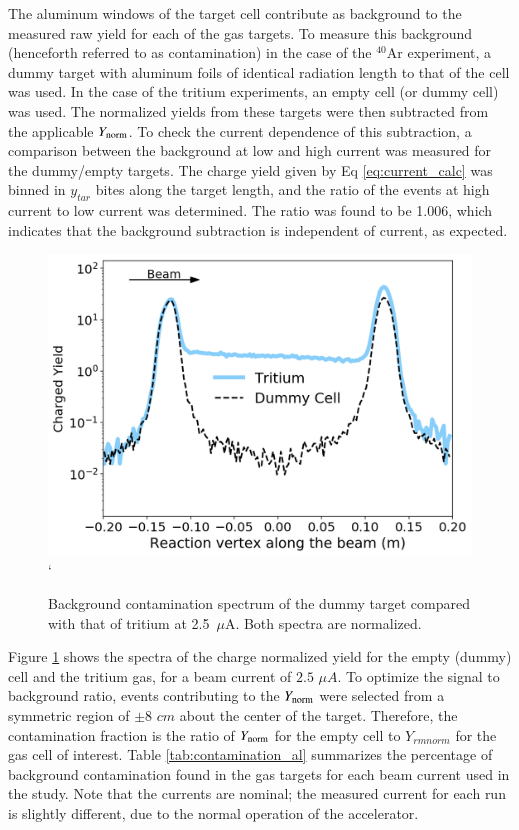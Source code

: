 \documentclass[final,5p,times,twocolumn]{elsarticle}
\begin{document}
The aluminum windows of the target cell contribute as background to the measured raw yield for each of the gas targets. To measure this background (henceforth referred to as contamination) in the case of the $^{40}$Ar experiment, a dummy target with aluminum foils of identical radiation length to that of the cell was used. In the case of the tritium experiments, an empty cell (or dummy cell)  was used. The normalized yields from these targets were then subtracted from the applicable $Y_{\rm{norm}}$. To check the current dependence of this subtraction, a comparison between the background at low and high current was measured for the dummy/empty targets. The charge yield given by Eq \ref{eq:current_calc} was binned in $y_{tar}$ bites along the target length, and the ratio of the events at high current to low current was determined. The ratio was found to be 1.006, which indicates that the background subtraction is independent of current, as expected. 

\begin{figure}[h]
 \centering
 \includegraphics[width=\linewidth]{images/contamination.pdf}`
  \caption{Background contamination spectrum of the dummy target compared with that of tritium at 2.5~$\mu$A.  Both spectra are normalized.}
  \label{fig:bk_empty}
\end{figure}

Figure \ref{fig:bk_empty} shows the spectra of the charge normalized yield for the empty (dummy) cell and the tritium gas, for a beam current of $2.5$ $\mu A$. To optimize the signal to background ratio, events contributing to the $Y_{\rm{norm}}$ were selected from a symmetric region of $\pm 8$ $cm$ about the center of the target. Therefore, the contamination fraction is the ratio of $Y_{\rm{norm}}$ for the empty cell to $Y_{rm{norm}}$ for the gas cell of interest. Table \ref{tab:contamination_al} summarizes the percentage of background contamination found in the gas targets for each beam current used in the study. Note that the currents are nominal; the measured current for each run is slightly different, due to the normal operation of the accelerator.
 
\end{document}
